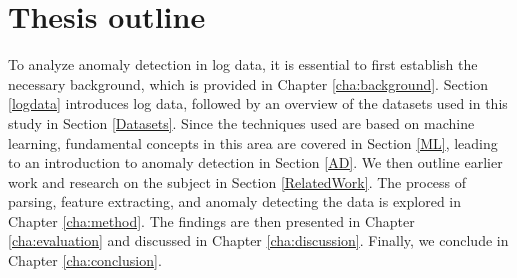 \section{Thesis outline}
To analyze anomaly detection in log data, it is essential to first establish the necessary background, which is provided in Chapter \ref{cha:background}. Section \ref{logdata} introduces log data, followed by an overview of the datasets used in this study in Section \ref{Datasets}. Since the techniques used are based on machine learning, fundamental concepts in this area are covered in Section \ref{ML}, leading to an introduction to anomaly detection in Section \ref{AD}. We then outline earlier work and research on the subject in Section \ref{RelatedWork}. The process of parsing, feature extracting, and anomaly detecting the data is explored in Chapter \ref{cha:method}. The findings are then presented in Chapter \ref{cha:evaluation} and discussed in Chapter \ref{cha:discussion}. Finally, we conclude in Chapter \ref{cha:conclusion}.




